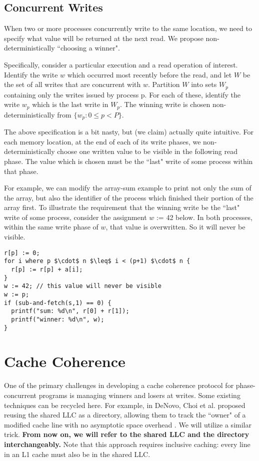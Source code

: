 \documentclass{article}
\begin{document}
\subsection{Concurrent Writes}
When two or more processes concurrently write to the same location, we need to specify what value will be returned at the next read. We propose non-deterministically ``choosing a winner".

Specifically, consider a particular execution and a read operation of interest. Identify the write $w$ which occurred most recently before the read, and let $W$ be the set of all writes that are concurrent with $w$. Partition $W$ into sets $W_p$ containing only the writes issued by process p. For each of these, identify the write $w_p$ which is the last write in $W_p$. The winning write is chosen non-deterministically from $\{w_p : 0 \leq p < P\}$.

The above specification is a bit nasty, but (we claim) actually quite intuitive. For each memory location, at the end of each of its write phases, we non-deterministically choose one written value to be visible in the following read phase. The value which is chosen must be the ``last" write of some process within that phase.

For example, we can modify the array-sum example to print not only the sum of the array, but also the identifier of the process which finished their portion of the array first. To illustrate the requirement that the winning write be the ``last" write of some process, consider the assignment $w$ := 42 below. In both processes, within the same write phase of $w$, that value is overwritten. So it will never be visible.

\begin{lstlisting}
r[p] := 0;
for i where p $\cdot$ n $\leq$ i < (p+1) $\cdot$ n {
  r[p] := r[p] + a[i];
}
w := 42; // this value will never be visible
w := p;
if (sub-and-fetch(s,1) == 0) {
  printf("sum: %d\n", r[0] + r[1]);
  printf("winner: %d\n", w);
}
\end{lstlisting}


\section{Cache Coherence}
One of the primary challenges in developing a cache coherence protocol for phase-concurrent programs is managing winners and losers at writes. Some existing techniques can be recycled here. For example, in DeNovo, Choi et al. proposed reusing the shared LLC as a directory, allowing them to track the ``owner" of a modified cache line with no asymptotic space overhead \cite{choi2010denovo}. We will utilize a similar trick. \textbf{From now on, we will refer to the shared LLC and the directory interchangeably.} Note that this approach requires inclusive caching: every line in an L1 cache must also be in the shared LLC.
\end{document}

